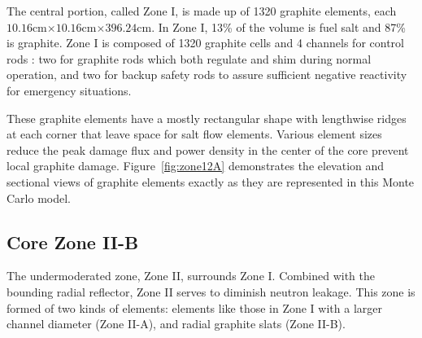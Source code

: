 \documentclass{anstrans}
\begin{document}
The central portion, called Zone I, is made up of 1320 graphite elements, each 
$10.16$cm$\times10.16$cm$\times396.24$cm.
In Zone I, 13\% of the volume is fuel salt and 87\% is 
graphite. Zone I is composed of 1320 graphite cells and 4 channels for control 
rods : two for graphite rods which both regulate and shim during normal operation, and two
for backup safety rods to assure sufficient negative reactivity for emergency situations.

These graphite elements have a mostly rectangular shape with lengthwise ridges 
at each corner that leave space for salt flow elements. Various element sizes 
reduce the peak damage flux and power density in the center of the core prevent 
local graphite damage. Figure~\ref{fig:zone12A} 
demonstrates the elevation and sectional views of graphite elements exactly as 
they are represented in this Monte Carlo model.

\subsection{Core Zone II-B}

The undermoderated zone, Zone II, surrounds Zone I.
Combined with the bounding radial reflector, Zone II serves to diminish neutron leakage. This zone is formed of two kinds of elements: elements like those 
in Zone I with a larger channel diameter (Zone II-A), and radial
graphite slats (Zone II-B). 
\end{document}
